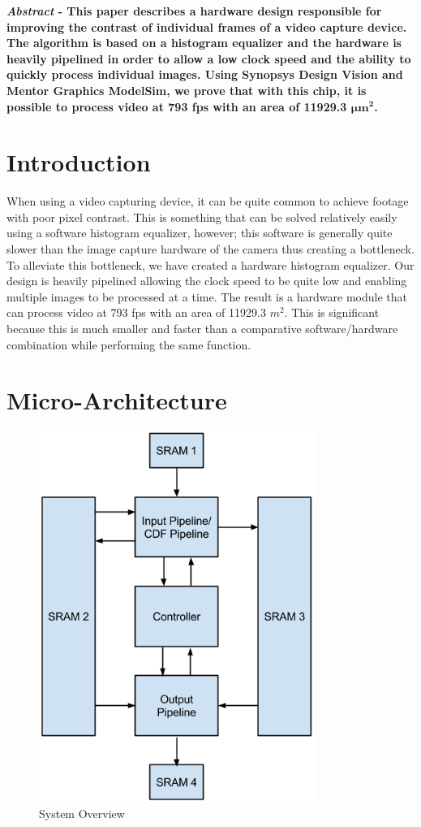 \documentclass[10pt]{IEEEtran}
\begin{document}

\textbf{\emph{Abstract} - This paper describes a hardware design responsible for improving the contrast of individual frames of a video capture device. The algorithm is based on a histogram equalizer and the hardware is heavily pipelined in order to allow a low clock speed and the ability to quickly process individual images. Using Synopsys Design Vision and Mentor Graphics ModelSim, we prove that with this chip, it is possible to process video at 793 fps with an area of 11929.3 $\mathbf{\boldsymbol\mu m^{2}}$.}
 

\section{Introduction}

When using a video capturing device, it can be quite common to achieve footage with poor pixel contrast. This is something that can be solved relatively easily using a software histogram equalizer, however; this software is generally quite slower than the image capture hardware of the camera thus creating a bottleneck. To alleviate this bottleneck, we have created a hardware histogram equalizer. Our design is heavily pipelined allowing the clock speed to be quite low and enabling multiple images to be processed at a time. The result is a hardware module that can process video at 793 fps with an area of 11929.3 $m^{2}$. This is significant because this is much smaller and faster than a comparative software/hardware combination while performing the same function.
 

\section{Micro-Architecture}

\begin{figure}[htb!]
	\includegraphics[width=90mm]{System_Overview.png}
	\caption{System Overview}
\end{figure}
\end{document}

